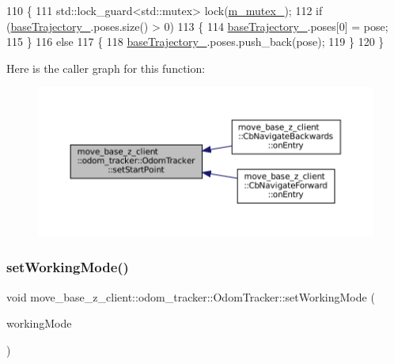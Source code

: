 \begin{DoxyCode}
110 \{
111     std::lock\_guard<std::mutex> lock(\hyperlink{classmove__base__z__client_1_1odom__tracker_1_1OdomTracker_a63676e03be48b18ac48d5e2f11f19a25}{m\_mutex\_});
112     \textcolor{keywordflow}{if} (\hyperlink{classmove__base__z__client_1_1odom__tracker_1_1OdomTracker_a83fa5a9bfe0b2683eee33444d3f030ea}{baseTrajectory\_}.poses.size() > 0)
113     \{
114         \hyperlink{classmove__base__z__client_1_1odom__tracker_1_1OdomTracker_a83fa5a9bfe0b2683eee33444d3f030ea}{baseTrajectory\_}.poses[0] = pose;
115     \}
116     \textcolor{keywordflow}{else}
117     \{
118         \hyperlink{classmove__base__z__client_1_1odom__tracker_1_1OdomTracker_a83fa5a9bfe0b2683eee33444d3f030ea}{baseTrajectory\_}.poses.push\_back(pose);
119     \}
120 \}
\end{DoxyCode}
Here is the caller graph for this function\+:
\nopagebreak
\begin{figure}[H]
\begin{center}
\leavevmode
\includegraphics[width=350pt]{classmove__base__z__client_1_1odom__tracker_1_1OdomTracker_afa402777496c8d0df39191f40377bd0e_icgraph}
\end{center}
\end{figure}
\mbox{\label{classmove__base__z__client_1_1odom__tracker_1_1OdomTracker_aebeb8ff6d1f9375d855def4a33b90731}} 
\subsubsection{\texorpdfstring{set\+Working\+Mode()}{setWorkingMode()}}
{\footnotesize\ttfamily void move\+\_\+base\+\_\+z\+\_\+client\+::odom\+\_\+tracker\+::\+Odom\+Tracker\+::set\+Working\+Mode (\begin{DoxyParamCaption}\item[{\hyperlink{namespacemove__base__z__client_1_1odom__tracker_adf3e5fc3644563922cc64a20a0197224}{Working\+Mode}}]{working\+Mode }\end{DoxyParamCaption})}

